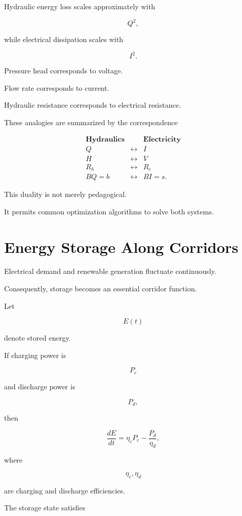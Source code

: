 \documentclass[11pt,fleqn]{book}
\numberwithin{equation}{chapter}
\theoremstyle{plain}
\theoremstyle{definition}
\theoremstyle{remark}
\begin{document}
Hydraulic energy loss scales approximately with

\[
Q^2,
\]

while electrical dissipation scales with

\[
I^2.
\]

Pressure head corresponds to voltage.

Flow rate corresponds to current.

Hydraulic resistance corresponds to electrical resistance.

These analogies are summarized by the correspondence

\[
\begin{array}{ccc}
\textbf{Hydraulics}
&
&
\textbf{Electricity}
\\[1ex]
Q
&
\leftrightarrow
&
I
\\
H
&
\leftrightarrow
&
V
\\
R_h
&
\leftrightarrow
&
R_e
\\
BQ=b
&
\leftrightarrow
&
BI=s.
\end{array}
\]

This duality is not merely pedagogical.

It permits common optimization algorithms to solve both systems.


\section{Energy Storage Along Corridors}

Electrical demand and renewable generation fluctuate continuously.

Consequently, storage becomes an essential corridor function.

Let

\[
E(t)
\]

denote stored energy.

If charging power is

\[
P_c
\]

and discharge power is

\[
P_d,
\]

then

\[
\boxed{
\frac{dE}{dt}
=
\eta_cP_c
-
\frac{P_d}{\eta_d},
}
\]

where

\[
\eta_c,
\eta_d
\]

are charging and discharge efficiencies.

The storage state satisfies
\end{document}
